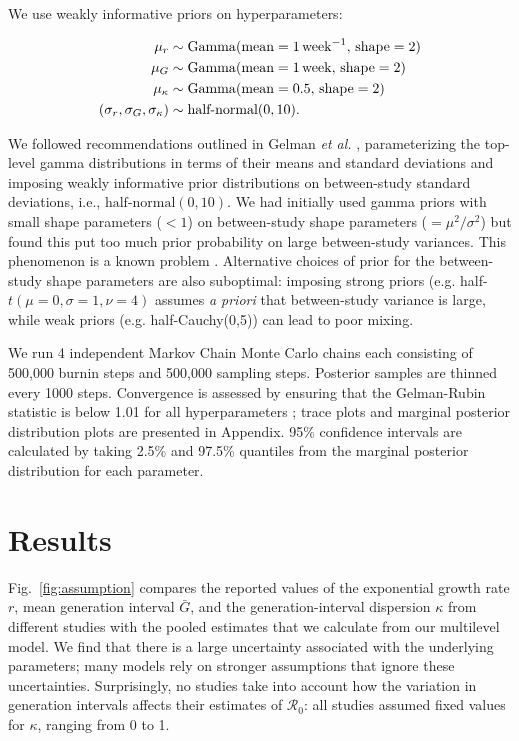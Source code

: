 \documentclass[12pt]{article}
\newcommand{\fref}[1]{Fig.~\ref{fig:#1}}
\newcommand{\Ro}{\ensuremath{{\mathcal R}_{0}}\xspace}
\begin{document}
We use weakly informative priors on hyperparameters:
\begin{linenomath*}
\begin{equation}
\begin{aligned}
\mu_r &\sim \mathrm{Gamma}(\mathrm{mean}=1\,\mathrm{week}^{-1},\,\mathrm{shape}=2)\\
\mu_G &\sim \mathrm{Gamma}(\mathrm{mean}=1\,\mathrm{week},\,\mathrm{shape}=2)\\
\mu_\kappa &\sim \mathrm{Gamma}(\mathrm{mean}=0.5,\,\mathrm{shape}=2)\\
(\sigma_r, \sigma_G, \sigma_\kappa) &\sim \textrm{half-normal}(0, 10).
\end{aligned}
\end{equation}
\end{linenomath*}
We followed recommendations outlined in Gelman \textit{et al.} \cite{gelman2006prior}, parameterizing the top-level gamma distributions in terms of their means and standard deviations and imposing weakly informative prior distributions on between-study standard deviations, i.e., $\textrm{half-normal}(0, 10)$.
We had initially used gamma priors with small shape parameters ($< 1$) on between-study shape parameters ($=\mu^2/\sigma^2$) but found this put too much prior probability on large between-study variances. This phenomenon is a known problem \cite{gelman2006prior}.
Alternative choices of prior for the between-study shape parameters are also suboptimal: imposing strong priors (e.g. half-$t(\mu=0,\sigma=1,\nu=4)$  assumes \textit{a priori} that between-study variance is large,  while weak priors (e.g. half-Cauchy(0,5)) can lead to poor mixing.

We run 4 independent Markov Chain Monte Carlo chains each consisting of 500,000 burnin steps and 500,000 sampling steps.
Posterior samples are thinned every 1000 steps.
Convergence is assessed by ensuring that the Gelman-Rubin statistic is below 1.01 for all hyperparameters \cite{gelman1992inference};
trace plots and marginal posterior distribution plots are presented in Appendix.
95\% confidence intervals are calculated by taking 2.5\% and 97.5\% quantiles from the marginal posterior distribution for each parameter.

\section{Results}

\fref{assumption} compares the reported values of the exponential growth rate $r$, mean generation interval $\bar G$, and the generation-interval dispersion $\kappa$ from different studies with the pooled estimates that we calculate from our multilevel model.
We find that there is a large uncertainty associated with the underlying parameters;
many models rely on stronger assumptions that ignore these uncertainties.
Surprisingly, no studies take into account how the variation in generation intervals affects their estimates of \Ro:
all studies assumed fixed values for $\kappa$, ranging from 0 to 1.
\end{document}
